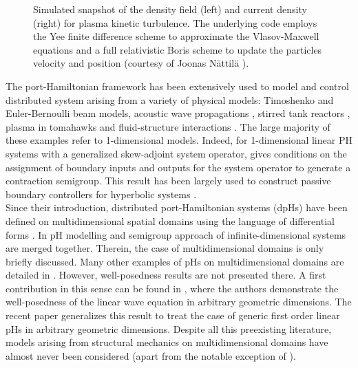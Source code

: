 \begin{figure}[htbp]%
	\centering
	\hspace{8pt}%
	\caption[]{Simulated snapshot of the density field (left) and current density (right) for plasma kinetic turbulence. The underlying code employs the Yee finite difference scheme \cite{yee1966numerical} to approximate the Vlasov-Maxwell equations and a full relativistic Boris scheme \cite{boris1970relativistic} to update the particles velocity and position (courtesy of Joonas N\"attil\"a \cite{nattila2019runko}).}%
	\label{fig:plasma}%
\end{figure}

The port-Hamiltonian framework has been extensively used to model and control distributed system arising from a variety of physical models: Timoshenko \cite{macchelli2004timo} and Euler-Bernoulli  \cite{aoues2017modeling} beam models, acoustic wave propagations \cite{trenchant2018}, stirred tank reactors \cite{ramirez2013irreversible},  plasma in tomahawks \cite{vu2016plasma} and fluid-structure interactions \cite{cardoso2017}. The large majority of these examples refer to 1-dimensional models. Indeed, for 1-dimensional linear PH systems with a generalized skew-adjoint system operator, \cite{legorrec2005} gives conditions on the assignment of boundary inputs and outputs for the system operator to generate a contraction semigroup. This result has been largely used to construct passive boundary controllers for hyperbolic systems \cite{villegas2009exponential,macchelli2016synthesis,macchelli2020exponential}. \\

Since their introduction, distributed port-Hamiltonian systems (dpHs) have been defined on multidimensional spatial domains using the language of differential forms \cite{vanderschaft2002}. In \cite{villegas2007} pH  modelling and semigroup approach of infinite-dimensional systems are merged together. Therein, the  case of multidimensional domains is only briefly discussed. Many other examples of pHs on multidimensional domains are detailed in \cite[Chapter 4]{duindam2009}. However, well-posedness results are not presented there. A first contribution in this sense can be found in \cite{zwart2015wave}, where the authors demonstrate the well-posedness of the linear wave equation in arbitrary geometric dimensions. The recent paper  \cite{skrepek2019wellposedness} generalizes this result to treat the case of generic first order linear pHs in arbitrary geometric dimensions. Despite all this preexisting literature, models arising from structural mechanics on multidimensional domains have almost never been considered (apart from the notable exception of \cite{macchelli2005mindlin}).  \\

